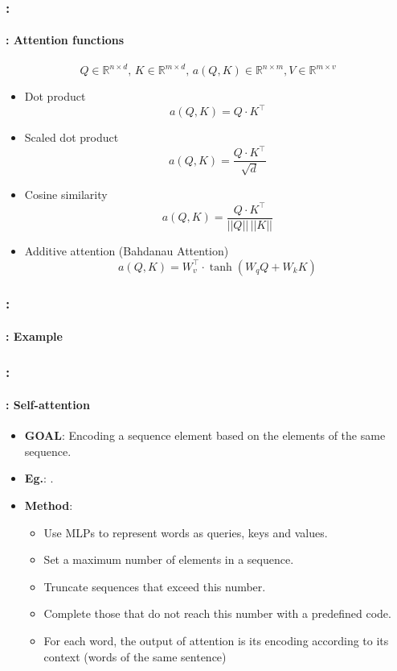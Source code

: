 \documentclass[xcolor=table]{beamer}
\begin{document}
\begin{frame}
	\frametitle{\insertshortsubtitle: \insertsection}
	\framesubtitle{\insertsubsection: Attention functions}
	
		\[Q \in \mathbb{R}^{n \times d}, \, K \in \mathbb{R}^{m \times d}, \, a(Q, K) \in \mathbb{R}^{n \times m}, V \in \mathbb{R}^{m \times v} \]
	
	\begin{itemize}

	\item Dot product
	\[a(Q, K) = Q \cdot K^\top \]
	
	\item Scaled dot product 
	\[a(Q, K) = \frac{Q \cdot K^\top}{\sqrt{d}}\]
	
	\item Cosine similarity
	\[a(Q, K) = \frac{Q \cdot K^\top}{||Q|| \, ||K||}\]
	
	\item Additive attention (Bahdanau Attention)
	\[a(Q, K) = W_v^\top \cdot \tanh(W_q Q + W_k K)\]
\end{itemize}
	
\end{frame}

\begin{frame}
	\frametitle{\insertshortsubtitle: \insertsection}
	\framesubtitle{\insertsubsection: Example}
	
	\begin{center}
	\end{center}
	
\end{frame}

\begin{frame}
	\frametitle{\insertshortsubtitle: \insertsection}
	\framesubtitle{\insertsubsection: Self-attention}
	
	\begin{itemize}
		\item \textbf{GOAL}: Encoding a sequence element based on the elements of the same sequence.
		\item \textbf{Eg.}: .
		\item \textbf{Method}:
		\begin{itemize}
			\item Use MLPs to represent words as queries, keys and values.
			\item Set a maximum number of elements in a sequence.
			\item Truncate sequences that exceed this number.
			\item Complete those that do not reach this number with a predefined code.
			\item For each word, the output of attention is its encoding according to its context (words of the same sentence)
		\end{itemize}
	\end{itemize}

\end{frame}
\end{document}
